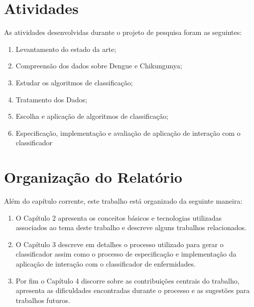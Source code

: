 \section{Atividades}
As atividades desenvolvidas durante o projeto de pesquisa foram as seguintes:
\begin{enumerate}
  \item Levantamento do estado da arte;
  \item Compreensão dos dados sobre Dengue e Chikungunya;
  \item Estudar os algoritmos de classificação;
  \item Tratamento dos Dados;
  \item Escolha e aplicação de algoritmos de classificação;
  \item Especificação,  implementação e avaliação de aplicação de interação com o classificador
\end{enumerate}

\section{Organização do Relatório}
Além do capítulo corrente, este trabalho está organizado da seguinte maneira:

\begin{enumerate}
  \item O Capítulo 2 apresenta os conceitos básicos e tecnologias utilizadas associados ao tema deste trabalho  e descreve alguns trabalhos relacionados.
  \item O Capítulo 3 descreve em detalhes o processo utilizado para gerar o classificador assim como o processo de especificação e implementação da aplicação de interação com o classificador de enfermidades.
  \item Por fim o Capítulo 4 discorre sobre as contribuições centrais do trabalho, apresenta  as dificuldades encontradas durante o processo e as sugestões para trabalhos futuros.
\end{enumerate}

